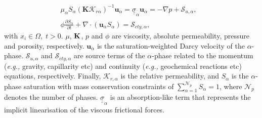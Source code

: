 \documentclass[preprint,authoryear,12pt]{elsarticle}
\newcommand{\eg}{{\it e.g., }}
\begin{document}
\begin{eqnarray}
&& \mu_{\alpha}S_{\alpha}\left({\mathbf K}\mathcal{K}_{r\alpha}\right)^{-1} {\mathbf u}_{\alpha} = \underline{\underline{\sigma}}_{\alpha} {\mathbf u}_{\alpha} = -\nabla p + \mathcal{S}_{u,\alpha},\hspace{1cm} \label{eqn:darcy_eqn} \\ %
&&\phi\displaystyle\frac{\partial S_{\alpha} }{\partial t} +   \nabla \cdot \left( {\mathbf u}_{\alpha}  S_{\alpha}\right) =  \mathcal{S}_{cty,\alpha},\label{eqn:saturation_eqn}
\end{eqnarray} 
with $x_{i}\in\Omega,\; t>0$. $\mu$, ${\bf K}$, $p$ and $\phi$ are viscosity, absolute permeability, pressure and porosity, respectively. $\mathbf{u}_{\alpha}$ is the saturation-weighted Darcy velocity of the $\alpha$-phase. $\mathcal{S}_{u,\alpha}$ and $\mathcal{S}_{cty,\alpha}$ are source terms of the $\alpha$-phase related to the momentum (\eg gravity, capillarity etc) and continuity (\eg geochemical reactions etc) equations, respectively. Finally, $\mathcal{K}_{r,\alpha}$ is the relative permeability, and $S_{\alpha}$ is the  $\alpha$-phase saturation with mass conservation constraints of $\sum\limits_{\alpha=1}^{\mathcal{N}_{p}} S_{\alpha} = 1$, where $\mathcal{N}_{p}$ denotes the number of phases. $\underline{\underline{\sigma}}_{\alpha}$ is an absorption-like term that represents the implicit linearisation of the viscous frictional forces.



\end{document}
